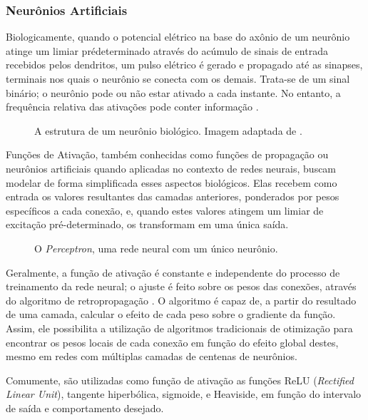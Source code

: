 \subsubsection{Neurônios Artificiais}

Biologicamente, quando o potencial elétrico na base do axônio de um neurônio atinge um limiar pré\-determinado através do acúmulo de sinais de entrada recebidos pelos dendritos, um pulso elétrico é gerado e propagado até as sinapses, terminais nos quais o neurônio se conecta com os demais.
Trata-se de um sinal binário; o neurônio pode ou não estar ativado a cada instante. No entanto, a frequência relativa das ativações pode conter informação \cite{behnkeHierarchicalNeuralNetworks2003}.

\begin{figure}[H]
    \centering
    
    \caption{A estrutura de um neurônio biológico. Imagem adaptada de \cite{dhp1080IdoSkemoPri2016}.}
    \label{fig:bio_neuron}
\end{figure}

Funções de Ativação, também conhecidas como funções de propagação ou neurônios artificiais quando aplicadas no contexto de redes neurais, buscam modelar de forma simplificada esses aspectos biológicos.
Elas recebem como entrada os valores resultantes das camadas anteriores, ponderados por pesos específicos a cada conexão, e, quando estes valores atingem um limiar de excitação pré-determinado, os transformam em uma única saída.

\begin{figure}[H]
    \centering
    
    \caption{O \textit{Perceptron}, uma rede neural com um único neurônio.}
    \label{fig:perceptron}
\end{figure}

Geralmente, a função de ativação é constante e independente do processo de treinamento da rede neural; o ajuste é feito sobre os pesos das conexões, através do algoritmo de retropropagação \cite{dreyfusArtificialNeuralNetworks1990}.
O algoritmo é capaz de, a partir do resultado de uma camada, calcular o efeito de cada peso sobre o gradiente da função.
Assim, ele possibilita a utilização de algoritmos tradicionais de otimização para encontrar os pesos locais de cada conexão em função do efeito global destes, mesmo em redes com múltiplas camadas de centenas de neurônios.

Comumente, são utilizadas como função de ativação as funções ReLU (\textit{Rectified Linear Unit}), tangente hiperbólica, sigmoide, e Heaviside, em função do intervalo de saída e comportamento desejado.

